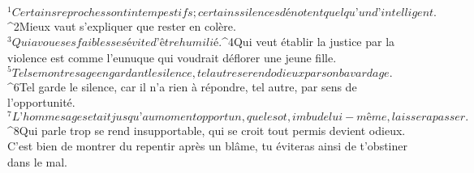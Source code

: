   
  
      
         
      \bchapter{}
${}^{1}Certains reproches sont intempestifs ;
        certains silences dénotent quelqu’un d’intelligent.
${}^{2}Mieux vaut s’expliquer que rester en colère.
${}^{3}Qui avoue ses faiblesses évite d’être humilié.
${}^{4}Qui veut établir la justice par la violence
        est comme l’eunuque qui voudrait déflorer une jeune fille.
${}^{5}Tel se montre sage en gardant le silence,
        tel autre se rend odieux par son bavardage.
${}^{6}Tel garde le silence, car il n’a rien à répondre,
        tel autre, par sens de l’opportunité.
${}^{7}L’homme sage se tait jusqu’au moment opportun,
        que le sot, imbu de lui-même, laissera passer.
${}^{8}Qui parle trop se rend insupportable,
        qui se croit tout permis devient odieux.
        \\C’est bien de montrer du repentir après un blâme,
        tu éviteras ainsi de t’obstiner dans le mal.
        
